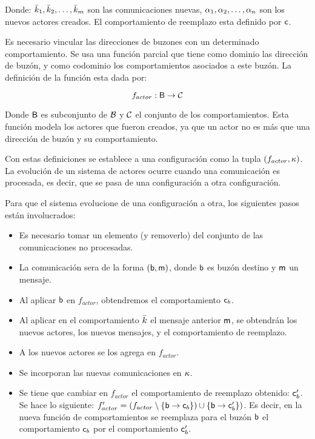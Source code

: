 Donde: $\bar{k}_1, \bar{k}_2, \ldots, \bar{k}_m$ son las comunicaciones nuevas, $\alpha_1, \alpha_2, \ldots, \alpha_n$ son los nuevos actores creados. El comportamiento de reemplazo esta definido por $\mathsf{c}$.

Es necesario vincular las direcciones de buzones con un determinado comportamiento. Se usa una función parcial que tiene como dominio las dirección de buzón, y como codominio los comportamientos asociados a este buzón. La definición de la función esta dada por:

\[
f_{actor} : \mathsf{B} \rightarrow \mathcal{C}
\]

Donde $\mathsf{B}$ es subconjunto de $\mathcal{B}$ y $\mathcal{C}$ el conjunto de los comportamientos. Esta función modela los actores que fueron creados, ya que un actor no es más que una dirección de buzón y su comportamiento.

Con estas definiciones se establece a una configuración como la tupla $(f_{actor}, \kappa)$. La evolución de un sistema de actores ocurre cuando una comunicación es procesada, es decir, que se pasa de una configuración a otra configuración.

Para que el sistema evolucione de una configuración a otra, los siguientes pasos están involucrados:
\begin{itemize}
 \item Es necesario tomar un elemento (y removerlo) del conjunto de las comunicaciones no procesadas. 
 \item La comunicación sera de la forma $(\mathsf{b}, \mathsf{m})$, donde $\mathsf{b}$ es buzón destino y $\mathsf{m}$ un mensaje. 
 \item Al aplicar $\mathsf{b}$ en $f_{actor}$, obtendremos el comportamiento $\mathsf{c}_b$. 
 \item Al aplicar en el comportamiento $\bar{k}$ el mensaje anterior $\mathsf{m}$, se obtendrán los nuevos actores, los nuevos mensajes, y el comportamiento de reemplazo.
 \item A los nuevos actores se los agrega en $f_{actor}$. 
 \item Se incorporan las nuevas comunicaciones en $\kappa$. 
 \item Se tiene que cambiar en $f_{actor}$ el comportamiento de reemplazo obtenido: $\mathsf{c}_b'$. Se hace lo siguiente:  $f'_{actor} = ( f_{actor} \setminus \{ \mathsf{b} \rightarrow \mathsf{c}_b \}) \cup \{ \mathsf{b} \rightarrow \mathsf{c}'_b \})$. Es decir, en la nueva función de comportamientos se reemplaza para el buzón $\mathsf{b}$ el comportamiento $\mathsf{c}_b$ por el comportamiento $\mathsf{c}'_b$.
\end{itemize} 

